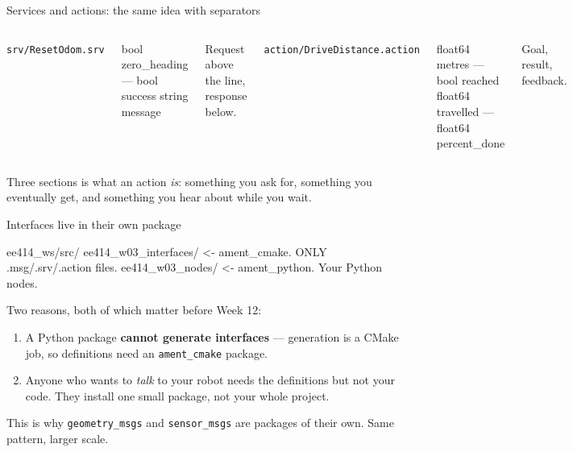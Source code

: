 \documentclass[aspectratio=169]{beamer}
\begin{document}
\begin{frame}[fragile]{Services and actions: the same idea with separators}
  \small
  \begin{columns}[T,onlytextwidth]
    {\footnotesize\texttt{srv/ResetOdom.srv}}
    \begin{spec}
bool zero_heading
---
bool success
string message
    \end{spec}
    \vspace{0.2em}
    {\footnotesize Request above the line, response below.}

    {\footnotesize\texttt{action/DriveDistance.action}}
    \begin{spec}
float64 metres
---
bool reached
float64 travelled
---
float64 percent_done
    \end{spec}
    \vspace{0.2em}
    {\footnotesize Goal, result, feedback.}
  \end{columns}

  \vspace{0.7em}
  \centering\small
  Three sections is what an action \emph{is}: something you ask for, something you eventually
  get, and something you hear about while you wait.
\end{frame}

\begin{frame}[fragile]{Interfaces live in their own package}
  \begin{shells}
ee414_ws/src/
  ee414_w03_interfaces/     <- ament_cmake. ONLY .msg/.srv/.action files.
  ee414_w03_nodes/          <- ament_python. Your Python nodes.
  \end{shells}

  \vspace{0.3em}
  \footnotesize
  Two reasons, both of which matter before Week 12:

  \begin{enumerate}\footnotesize
    \item A Python package \textbf{cannot generate interfaces} --- generation is a CMake job,
          so definitions need an \texttt{ament\_cmake} package.
    \item Anyone who wants to \emph{talk} to your robot needs the definitions but not your
          code. They install one small package, not your whole project.
  \end{enumerate}

  \begin{underhood}
    \footnotesize
    This is why \texttt{geometry\_msgs} and \texttt{sensor\_msgs} are packages of their own.
    Same pattern, larger scale.
  \end{underhood}
\end{frame}
\end{document}
